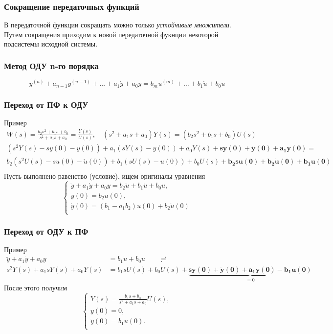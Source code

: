 \documentclass[A4]{article}
\begin{document}
\subsubsection{Сокращение передаточных функций}
В передаточной функции сокращать можно только \emph{устойчивые множители}. Путем сокращения приходим к новой передаточной фукнции некоторой подсистемы исходной системы.
\subsubsection{Метод ОДУ n-го порядка}
\begin{equation}
y^{(n)}+a_{n-1}y^{(n-1)}+\ldots+a_1\dot{y}+a_0y=b_mu^{(m)}+\ldots+b_1\dot{u}+b_0 u
\end{equation}
\subsubsection{Переход от ПФ к ОДУ}
Пример
\begin{equation}
\begin{aligned}
W(s)=\frac{b_2s^2+b_1s+b_0}{s^2+a_1s+a_0}=\frac{Y(s)}{U(s)},\quad (s^2+a_1s+a_0)Y(s)=(b_2s^2+b_1s+b_0)U(s)\\
(s^2Y(s)-sy(0)-\dot{y}(0))+a_1(sY(s)-y(0))+a_0Y(s)+\bm{sy(0)+\dot{y}(0)+a_1y(0)}=\\b_2(s^2U(s)-su(0)-\dot{u}(0))+b_1(sU(s)-u(0))+b_0U(s)+\bm{b_2su(0)+b_2\dot{u}(0)+b_1u(0)}\\
\end{aligned}
\end{equation}
Пусть выполнено равенство (условие), ищем оригиналы уравнения
\begin{equation}
\left\{\begin{array}{cc}
\ddot{y}+a_1\dot{y}+a_0y=b_2\ddot{u}+b_1\dot{u}+b_0u,\\
y(0)=b_2u(0),\\
\dot{y}(0)=(b_1-a_1b_2)u(0)+b_2\dot{u}(0)\\
\end{array}\right.
\end{equation}
\subsubsection{Переход от ОДУ к ПФ}
Пример
\begin{equation}
\begin{aligned}
\ddot{y}+a_1\dot{y}+a_0y&=b_1\dot{u}+b_0u\quad\quad\risingdotseq\\
s^2Y(s)+a_1sY(s)+a_0Y(s)&=b_1sU(s)+b_0U(s)+\underbrace{\bm{sy(0)+\dot{y}(0)+a_1y(0)-b_1u(0)}}_{=0}
\end{aligned}
\end{equation}
После этого получим
\begin{equation}
\left\{\begin{array}{cc}
Y(s)=\frac{b_1s+b_0}{s^2+a_1s+a_0}U(s),\\
y(0)=0,\\
\dot{y}(0)=b_1u(0).\\
\end{array}\right.
\end{equation}
\end{document}
